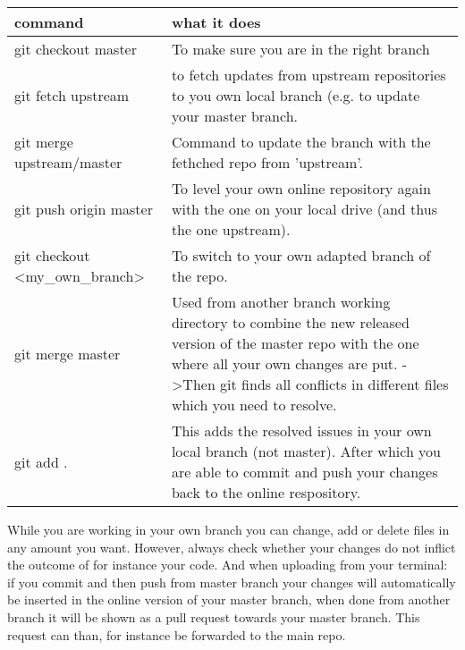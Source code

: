   
  \begin{center}
\begin{tabular}{l|l}
\textbf{command} &  \textbf{what it does} \\
\hline
git checkout master & To make sure you are in the right branch \\
  git fetch upstream & to fetch updates from upstream repositories to you own local branch (e.g. to update your master branch. \\
  git merge upstream/master & Command to update the branch with the fethched repo from 'upstream'. \\
  git push origin master & To level your own online repository again with the one on your local drive (and thus the one upstream). \\
  git checkout \textless my\_own\_branch\textgreater & To switch to your own adapted branch of the repo. \\
  git merge master & Used from another branch working directory to combine the new released version of the master repo with the one where all your own changes are put. -\textgreater Then git finds all conflicts in different files which you need to resolve. \\
  git add . & This adds the resolved issues in your own local branch (not master). After which you are able to commit and push your changes back to the online respository. 
\end{tabular}
\end{center}


While you are working in your own branch you can change, add or delete files in any amount you want. However, always check whether your changes do not inflict the outcome of for instance your code. And when uploading from your terminal: if you commit and then push from master branch your changes will automatically be inserted in the online version of your master branch, when done from another branch it will be shown as a pull request towards your master branch. This request can than, for instance be forwarded to the main repo.\\

